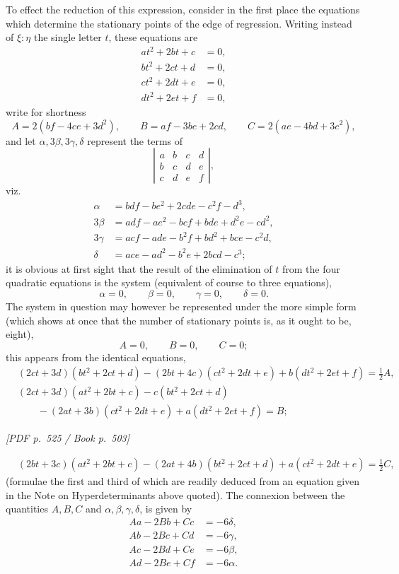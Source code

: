 \documentclass[11pt]{article}
\newcommand{\Page}[2]{\bigskip\noindent\textit{[PDF p.~#1 / Book p.~#2]}\par\smallskip}
\begin{document}
To effect the reduction of this expression, consider in the first place the equations
which determine the stationary points of the edge of regression. Writing instead of
$\xi:\eta$ the single letter $t$, these equations are
\[
\begin{aligned}
at^2+2bt+c&=0,\\
bt^2+2ct+d&=0,\\
ct^2+2dt+e&=0,\\
dt^2+2et+f&=0,
\end{aligned}
\]
write for shortness
\[
        A=2(bf-4ce+3d^2),\qquad
        B=af-3be+2cd,\qquad
        C=2(ae-4bd+3c^2),
\]
and let $\alpha,3\beta,3\gamma,\delta$ represent the terms of
\[
\left|
\begin{array}{cccc}
a&b&c&d\\
b&c&d&e\\
c&d&e&f
\end{array}
\right|,
\]
viz.
\[
\begin{aligned}
\alpha&=bdf-be^2+2cde-c^2f-d^3,\\
3\beta&=adf-ae^2-bcf+bde+d^2e-cd^2,\\
3\gamma&=acf-ade-b^2f+bd^2+bce-c^2d,\\
\delta&=ace-ad^2-b^2e+2bcd-c^3;
\end{aligned}
\]
it is obvious at first sight that the result of the elimination of $t$ from the four
quadratic equations is the system (equivalent of course to three equations),
\[
        \alpha=0,\qquad \beta=0,\qquad \gamma=0,\qquad \delta=0.
\]
The system in question may however be represented under the more simple form (which
shows at once that the number of stationary points is, as it ought to be, eight),
\[
        A=0,\qquad B=0,\qquad C=0;
\]
this appears from the identical equations,
\[
\begin{aligned}
&(2ct+3d)(bt^2+2ct+d)
 -(2bt+4c)(ct^2+2dt+e)
 +b(dt^2+2et+f)=\tfrac12 A,\\
&(2ct+3d)(at^2+2bt+c)
 -c(bt^2+2ct+d)\\
&\qquad -(2at+3b)(ct^2+2dt+e)
 +a(dt^2+2et+f)=B;
\end{aligned}
\]

\Page{525}{503}

\[
\begin{aligned}
&(2bt+3c)(at^2+2bt+c)
 -(2at+4b)(bt^2+2ct+d)
 +a(ct^2+2dt+e)=\tfrac12 C,
\end{aligned}
\]
(formulae the first and third of which are readily deduced from an equation given in
the Note on Hyperdeterminants above quoted). The connexion between the quantities
$A,B,C$ and $\alpha,\beta,\gamma,\delta$, is given by
\[
\begin{aligned}
A a-2B b+C c&=-6\delta,\\
A b-2B c+C d&=-6\gamma,\\
A c-2B d+C e&=-6\beta,\\
A d-2B e+C f&=-6\alpha.
\end{aligned}
\]
\end{document}
